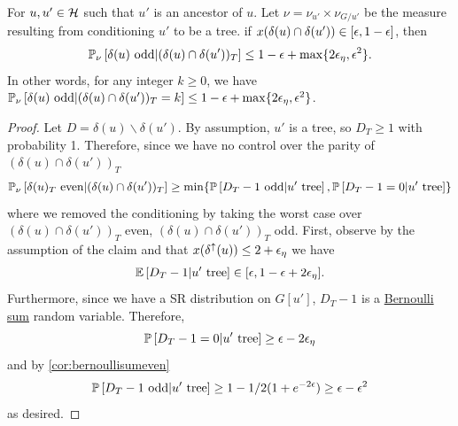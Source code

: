 \begin{claim}
\label{claim:top}
For $u,u'\in \mathcal{H}$ such that $u'$ is an ancestor of $u$. Let $\nu=\nu_{u'}\times\nu_{G/u'}$ be the measure resulting from conditioning $u'$ to be a tree. %
if $x(\delta (u) \cap \delta(u')) \in [ {\epsilon}, 1 -{\epsilon}]$, then
	\begin{equation}
	\label{eq:uandSprime}
	 {\mathbb{P}}_{\nu}\left[\delta (u)\text{ odd} |  (\delta(u)\cap \delta(u'))_T\right] \leq 1-{\epsilon}+\max\{2{\epsilon}_\eta,{\epsilon}^2\}.
	\end{equation}
	In other words, for any integer $k \ge 0$, we have ${\mathbb{P}}_{\nu}\left[\delta (u)\text{ odd} |  (\delta(u)\cap \delta(u'))_T = k\right] \le 1-{\epsilon}+\max\{2{\epsilon}_\eta,{\epsilon}^2\}$. 
\end{claim}
\begin{proof}
Let $D=\delta(u)\smallsetminus \delta(u')$. By assumption, $u'$ is a tree, so $D_T\geq 1$ with probability 1. Therefore, since we have no control over the parity of $(\delta(u)\cap\delta(u'))_T$
\begin{align*}
	{\mathbb{P}}_{\nu}\left[\delta (u)_T\text{ even} |(\delta(u)\cap\delta(u'))_T\right] \geq \min\{{\mathbb{P}}\left[D_T-1\text{ odd}|u'\text{ tree}\right], {\mathbb{P}}\left[D_T-1=0|u'\text{ tree}\right]\}
\end{align*}
where we removed the conditioning by taking the worst case over $(\delta(u) \cap \delta(u'))_T$ even, $(\delta(u) \cap \delta(u'))_T$ odd. First, observe by the assumption of the claim and that $x(\delta^\uparrow(u))\leq 2+{\epsilon}_\eta$ we have
$${\mathbb{E}}\left[D_T-1 | u'\text{ tree}\right] \in [{\epsilon}, 1 - {\epsilon}+2{\epsilon}_\eta].$$
Furthermore, since we have a SR distribution on $G[u']$, $D_T-1$ is a \hyperlink{tar:BS}{Bernoulli sum} random variable.
Therefore, 
$${\mathbb{P}}\left[D_T-1=0|u'\text{ tree}\right]\geq {\epsilon}-2{\epsilon}_\eta$$ 
and by \cref{cor:bernoullisumeven} 
$${\mathbb{P}}\left[D_T-1\text{ odd}|u'\text{ tree}\right] \geq 1-1/2(1+e^{-2{\epsilon}})\geq {\epsilon}-{\epsilon}^2$$
as desired. %
%
%
%
\end{proof}


